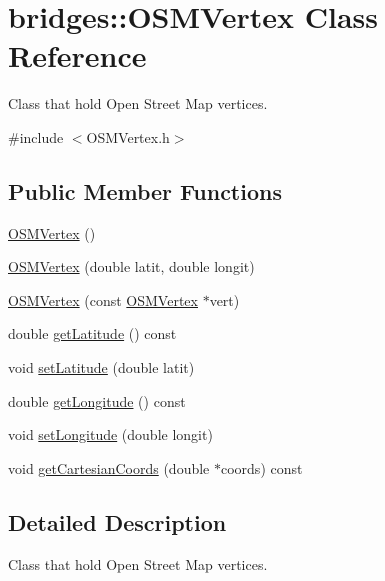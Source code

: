 \hypertarget{classbridges_1_1_o_s_m_vertex}{}\section{bridges\+::O\+S\+M\+Vertex Class Reference}
\label{classbridges_1_1_o_s_m_vertex}


Class that hold Open Street Map vertices.  




{\ttfamily \#include $<$O\+S\+M\+Vertex.\+h$>$}

\subsection*{Public Member Functions}
\begin{DoxyCompactItemize}
\item 
\mbox{\hyperlink{classbridges_1_1_o_s_m_vertex_a80b1abcf72326fa44ec74faf2236418e}{O\+S\+M\+Vertex}} ()
\item 
\mbox{\hyperlink{classbridges_1_1_o_s_m_vertex_a014dddd55752cad9aa87cc45c04b4db8}{O\+S\+M\+Vertex}} (double latit, double longit)
\item 
\mbox{\hyperlink{classbridges_1_1_o_s_m_vertex_a00c4a80dd2a249f9e1dc92c0ed798356}{O\+S\+M\+Vertex}} (const \mbox{\hyperlink{classbridges_1_1_o_s_m_vertex}{O\+S\+M\+Vertex}} $\ast$vert)
\item 
double \mbox{\hyperlink{classbridges_1_1_o_s_m_vertex_aeb44f4c3967d9ed15c606699c830ac2c}{get\+Latitude}} () const
\item 
void \mbox{\hyperlink{classbridges_1_1_o_s_m_vertex_a8011165f0932b3b69cf303b41b2d55a1}{set\+Latitude}} (double latit)
\item 
double \mbox{\hyperlink{classbridges_1_1_o_s_m_vertex_a90d51ece713519a272e4224171b30b34}{get\+Longitude}} () const
\item 
void \mbox{\hyperlink{classbridges_1_1_o_s_m_vertex_a80cdc32c79a8f2e5c962be3856b75229}{set\+Longitude}} (double longit)
\item 
void \mbox{\hyperlink{classbridges_1_1_o_s_m_vertex_a3c89840e0c5414d38ca177183a6052fa}{get\+Cartesian\+Coords}} (double $\ast$coords) const
\end{DoxyCompactItemize}


\subsection{Detailed Description}
Class that hold Open Street Map vertices. 

